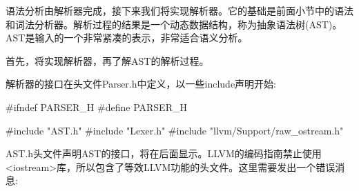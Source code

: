 语法分析由解析器完成，接下来我们将实现解析器。它的基础是前面小节中的语法和词法分析器。解析过程的结果是一个动态数据结构，称为抽象语法树(AST)。AST是输入的一个非常紧凑的表示，非常适合语义分析。

首先，将实现解析器，再了解AST的解析过程。


解析器的接口在头文件Parser.h中定义，以一些include声明开始:

\begin{cpp}
#ifndef PARSER_H
#define PARSER_H

#include "AST.h"
#include "Lexer.h"
#include "llvm/Support/raw_ostream.h"
\end{cpp}

AST.h头文件声明AST的接口，将在后面显示。LLVM的编码指南禁止使用<iostream>库，所以包含了等效LLVM功能的头文件。这里需要发出一个错误消息:

